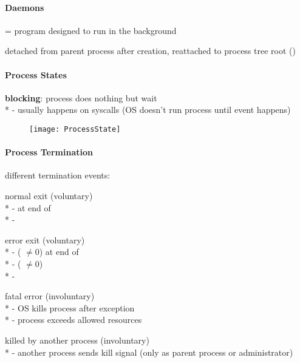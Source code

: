 \paragraph{Daemons}
\begin{items}
  \item = program designed to run in the background
  \item detached from parent process after creation, reattached to process tree root ()
\end{items}

\paragraph{Process States}
\begin{items}
  \item \textbf{blocking}: process does nothing but wait \\*
    - usually happens on syscalls (OS doesn't run process until event happens)
\end{items}

\begin{figure}[H]\centering\label{ProcessState}\texttt{[image: ProcessState]}\end{figure}

\paragraph{Process Termination}
\begin{items}
  \item different termination events: 
  \begin{enumeration}
    \item normal exit (voluntary) \\*
      -  at end of  \\*
      - 
    \item error exit (voluntary) \\*
      -  ( \( \neq 0 \)) at end of  \\*
      -  ( \( \neq 0 \)) \\*
      - 
    \item fatal error (involuntary) \\*
      - OS kills process after exception \\*
      - process exceeds allowed resources
    \item killed by another process (involuntary) \\*
      - another process sends kill signal (only as parent process or administrator)
  \end{enumeration}
\end{items}

